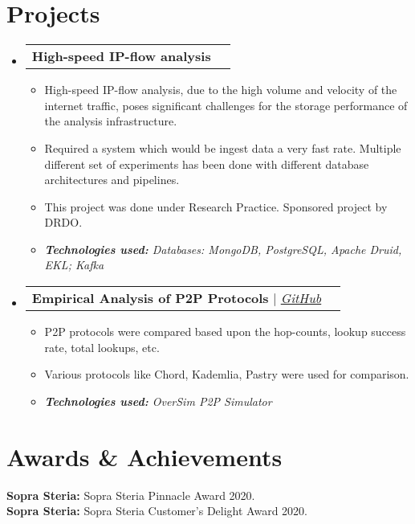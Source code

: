 \documentclass[letterpaper,11pt]{article}
\makeatletter
\newcommand{\resumeItem}[1]{
  \item\small{
    {#1 \vspace{-2pt}}
  }
}
\newcommand{\resumeProjectHeading}[2]{
    \vspace{-2pt}\item
    \begin{tabular*}{0.97\textwidth}{l@{\extracolsep{\fill}}r}
      \small#1 & #2 \\
    \end{tabular*}\vspace{-7pt}
}
\newcommand{\resumeSubHeadingListStart}{\begin{itemize}[leftmargin=0.15in, label={}]}
\newcommand{\resumeSubHeadingListEnd}{\end{itemize}}
\newcommand{\resumeItemListStart}{\begin{itemize}}
\newcommand{\resumeItemListEnd}{\end{itemize}\vspace{-5pt}}
\makeatother
\begin{document}
\section{Projects}
    \vspace{3pt}
    \resumeSubHeadingListStart
      
      \resumeProjectHeading
        {\textbf{High-speed IP-flow analysis} \emph{}}{}
          \resumeItemListStart
            \resumeItem{High-speed IP-flow analysis, due to the high volume and velocity of the internet traffic, poses significant challenges for the storage performance of the analysis infrastructure.}
            \resumeItem{Required a system which would be ingest data a very fast rate. Multiple different set of experiments has been done with different database architectures and pipelines.}
            \resumeItem{This project was done under Research Practice. Sponsored project by DRDO.}
            \resumeItem{\textit{\textbf{Technologies used: } Databases: MongoDB, PostgreSQL, Apache Druid, EKL; Kafka}}
          \resumeItemListEnd
      
      \resumeProjectHeading
        {\textbf{Empirical Analysis of P2P Protocols} $|$ \emph{\href{https://github.com/skjha98/P2P-Protocols-Comparision}{\color{blue}GitHub}}}{}
          \resumeItemListStart
            \resumeItem{P2P protocols were compared based upon the hop-counts, lookup success rate, total lookups, etc.}
            \resumeItem{Various protocols like Chord, Kademlia, Pastry were used for comparison.}
            \resumeItem{\textit{\textbf{Technologies used: } OverSim P2P Simulator}}
          \resumeItemListEnd
      
    \resumeSubHeadingListEnd




\section{Awards \& Achievements}
  \vspace{2pt}
  \resumeSubHeadingListStart
    \small{\item{
        \textbf{Sopra Steria:}{ Sopra Steria Pinnacle Award 2020.} \\ \vspace{3pt}
        \textbf{Sopra Steria:}{ Sopra Steria Customer's Delight Award 2020.} \\ \vspace{3pt}
    }}
  \resumeSubHeadingListEnd
\end{document}
